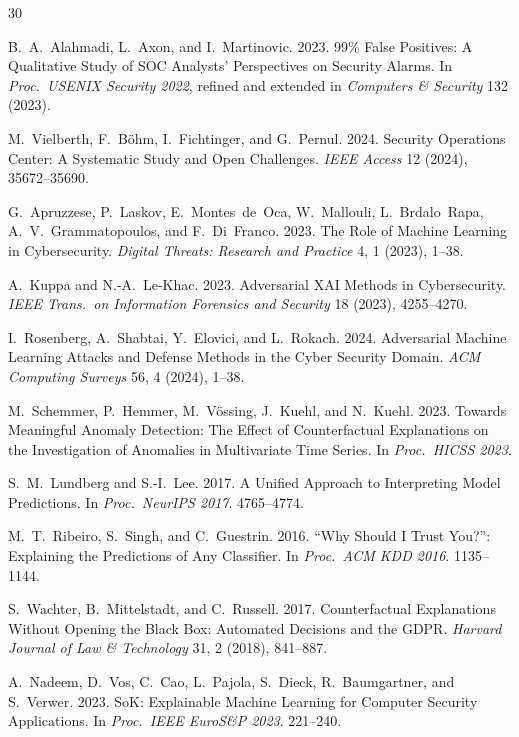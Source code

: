 \documentclass[sigconf,nonacm]{acmart}
\begin{document}
\sloppy

\begin{thebibliography}{30}

B.~A.~Alahmadi, L.~Axon, and I.~Martinovic. 2023. 99\% False Positives:
A Qualitative Study of SOC Analysts' Perspectives on Security Alarms.
In \textit{Proc.\ USENIX Security 2022}, refined and extended in
\textit{Computers \& Security} 132 (2023).

M.~Vielberth, F.~B\"ohm, I.~Fichtinger, and G.~Pernul. 2024.
Security Operations Center: A Systematic Study and Open Challenges.
\textit{IEEE Access} 12 (2024), 35672--35690.

G.~Apruzzese, P.~Laskov, E.~Montes~de~Oca, W.~Mallouli, L.~Brdalo~Rapa,
A.~V.~Grammatopoulos, and F.~Di~Franco. 2023. The Role of Machine Learning in
Cybersecurity. \textit{Digital Threats: Research and Practice} 4, 1
(2023), 1--38.

A.~Kuppa and N.-A.~Le-Khac. 2023. Adversarial XAI Methods in Cybersecurity.
\textit{IEEE Trans.\ on Information Forensics and Security} 18 (2023),
4255--4270.

I.~Rosenberg, A.~Shabtai, Y.~Elovici, and L.~Rokach. 2024. Adversarial
Machine Learning Attacks and Defense Methods in the Cyber Security Domain.
\textit{ACM Computing Surveys} 56, 4 (2024), 1--38.

M.~Schemmer, P.~Hemmer, M.~V\"ossing, J.~Kuehl, and N.~Kuehl. 2023.
Towards Meaningful Anomaly Detection: The Effect of Counterfactual
Explanations on the Investigation of Anomalies in Multivariate Time
Series. In \textit{Proc.\ HICSS 2023}.

S.~M.~Lundberg and S.-I.~Lee. 2017. A Unified Approach to Interpreting
Model Predictions. In \textit{Proc.\ NeurIPS 2017}. 4765--4774.

M.~T.~Ribeiro, S.~Singh, and C.~Guestrin. 2016. ``Why Should I Trust You?'':
Explaining the Predictions of Any Classifier. In \textit{Proc.\ ACM KDD 2016}.
1135--1144.

S.~Wachter, B.~Mittelstadt, and C.~Russell. 2017. Counterfactual
Explanations Without Opening the Black Box: Automated Decisions and the
GDPR. \textit{Harvard Journal of Law \& Technology} 31, 2 (2018),
841--887.

A.~Nadeem, D.~Vos, C.~Cao, L.~Pajola, S.~Dieck, R.~Baumgartner, and
S.~Verwer. 2023. SoK: Explainable Machine Learning for Computer Security
Applications. In \textit{Proc.\ IEEE EuroS\&P 2023}. 221--240.


\end{thebibliography}
\end{document}

